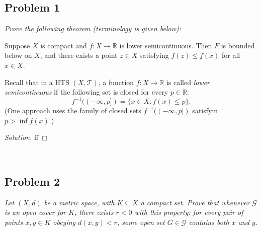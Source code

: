 \documentclass{article}
\newcommand{\R}{{\mathbb R}}
\begin{document}
\subsection*{Problem 1}
{\it Prove the following theorem (terminology is given below):
\begin{center}
	Suppose $X$ is compact and $f \colon X \to \R$ is lower semicontinuous.
	Then $F$ is bounded below on $X$,
	and there exists a point $z \in X$ satisfying $f(z) \leq f(x)$ for all $x \in X$.
\end{center}
Recall that in a HTS $(X, \mathcal{T})$, a function $f \colon X \to \R$
is called \emph{lower semicontinuous} if the following set
is closed for every $p \in \R$:
\[
	f^{-1}((-\infty,p]) = \{x \in X \colon f(x) \leq p \}.
\]
(One approach uses the family of closed sets
$f^{-1}((-\infty,p])$ satisfyin $p > \inf f(x)$.)}

\begin{proof}[Solution]\let\qed\relax
	ff
\end{proof}
\clearpage
~\clearpage

\subsection*{Problem 2}
{\it Let $(X, d)$ be a metric space, with $K \subseteq X$ a compact set.
Prove that whenever $\mathcal{G}$ is an open cover for $K$,
there exists $r < 0$ with this property:
for every pair of points $x,y \in K$ obeying $d(x,y) < r$,
some open set $G \in \mathcal{G}$ contains both $x$ and $y$.}
\end{document}
